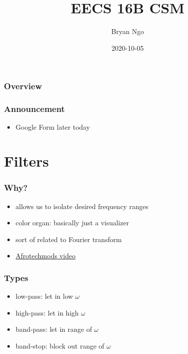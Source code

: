 \documentclass[aspectratio=169]{beamer}
\title{EECS 16B CSM}
\author{Bryan Ngo}
\date{2020-10-05}
\institute{Computer Science Mentors}
\begin{document}
\begin{frame}
    \maketitle
\end{frame}

\begin{frame}
    \frametitle{Overview}

    \tableofcontents
\end{frame}

\begin{frame}
    \frametitle{Announcement}

    \begin{itemize}
        \item Google Form later today
    \end{itemize}
\end{frame}

\section{Filters}

\begin{frame}
    \frametitle{Why?}

    \begin{itemize}
        \item allows us to isolate desired frequency ranges
        \item color organ: basically just a visualizer
        \item sort of related to Fourier transform
        \item \href{https://youtu.be/OBM5T5_kgdI}{Afrotechmods video}
    \end{itemize}
\end{frame}

\begin{frame}
    \frametitle{Types}

    \begin{itemize}
        \item low-pass: let in low \(\omega\)
        \item high-pass: let in high \(\omega\)
        \item band-pass: let in range of \(\omega\)
        \item band-stop: block out range of \(\omega\)
    \end{itemize}

\end{frame}
\end{document}

